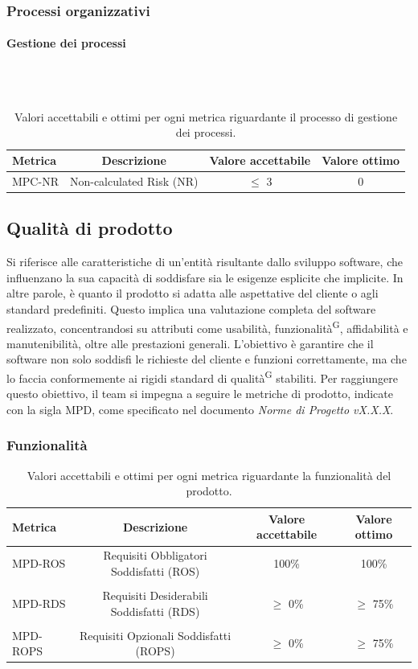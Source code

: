 \documentclass[8pt]{article}
\newcommand{\glossterm}[1]{#1\textsuperscript{G}} %
\newcommand{\subsubsubsection}[1]{\paragraph{#1}\mbox{}\\\\}
\begin{document}
\subsubsection{Processi organizzativi}
\subsubsubsection{Gestione dei processi}
\begin{table}[H]	
	\centering
	\begin{tabular}{lccc}
		\toprule
		\textbf{Metrica}& \textbf{Descrizione} & \textbf{Valore accettabile} & \textbf{Valore ottimo} \\
		\midrule
		MPC-NR & Non-calculated Risk (NR) & $\leq$ 3 & 0\\
		\bottomrule
	\end{tabular}
	\caption{Valori accettabili e ottimi per ogni metrica riguardante il processo di gestione dei processi.}
	\label{table:Valori accettabili e ottimi per ogni metrica riguardante il processo di gestione dei processi.}
\end{table}
\subsection{Qualità di prodotto}
Si riferisce alle caratteristiche di un'entità risultante dallo sviluppo software, che influenzano la sua capacità di soddisfare sia le esigenze esplicite che implicite. In altre parole, è quanto il prodotto si adatta alle aspettative del cliente o agli standard predefiniti. Questo implica una valutazione completa del software realizzato, concentrandosi su attributi come usabilità, \glossterm{funzionalità}, affidabilità e manutenibilità, oltre alle prestazioni generali. L'obiettivo è garantire che il software non solo soddisfi le richieste del cliente e funzioni correttamente, ma che lo faccia conformemente ai rigidi standard di \glossterm{qualità} stabiliti. Per raggiungere questo obiettivo, il team si impegna a seguire le metriche di prodotto, indicate con la sigla MPD, come specificato nel documento \textit{Norme di Progetto vX.X.X}.
\subsubsection{Funzionalità}
\begin{table}[H]	
	\centering
	\begin{tabular}{lccc}
		\toprule
		\textbf{Metrica}& \textbf{Descrizione} & \textbf{Valore accettabile} & \textbf{Valore ottimo} \\
		\midrule
		MPD-ROS& Requisiti Obbligatori Soddisfatti (ROS) & 100\% & 100\%\\\\
		MPD-RDS & Requisiti Desiderabili Soddisfatti (RDS) & $\geq$ 0\% & $\geq$ 75\% \\\\
		MPD-ROPS & Requisiti Opzionali Soddisfatti (ROPS) & $\geq$ 0\% & $\geq$ 75\% \\
		\bottomrule
	\end{tabular}
	\caption{Valori accettabili e ottimi per ogni metrica riguardante la funzionalità del prodotto.}
	\label{table:Valori accettabili e ottimi per ogni metrica riguardante la funzionalità del prodotto.}
\end{table}
\end{document}
